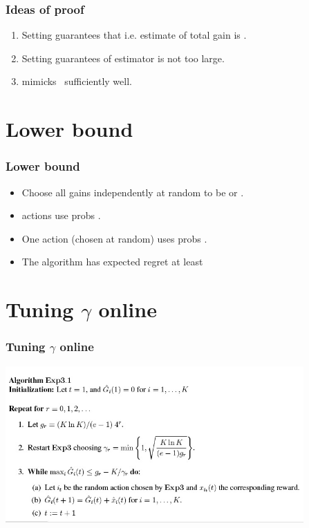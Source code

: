 \documentclass[handout]{beamer}
\begin{document}
\begin{frame}
\frametitle{Ideas of proof}
\begin{enumerate}
\item Setting
\R{\[
        \hx{j}{t} = \left\{ \begin{array}{cl}
                \x{j}{t}/\p{j}{t} & \mbox{\rm if $j=\i{t}$}
        \\
                0 & \mbox{\rm otherwise,}
        \end{array} \right.
\]}
guarantees that
i.e. estimate of total gain is .
\item
Setting  guarantees  of estimator is not too large.
\item
\B{$\Aest$} mimicks \B{\hedge}\ sufficiently well.
\end{enumerate}
\end{frame}

\section{Lower bound}

\begin{frame}
\frametitle{Lower bound}
\begin{itemize}
\item Choose all gains independently at random to be  or .
\item {} actions use probs .
\item One action (chosen at random) uses probs .
\item The  algorithm has expected regret at least 
\end{itemize}
\end{frame}

\section{Tuning $\gamma$ online}

\begin{frame}
\frametitle{Tuning $\gamma$ online}
\includegraphics[height=6cm]{figures/Exp3-1.jpg}
\end{frame}
\end{document}
